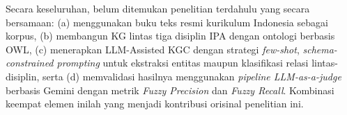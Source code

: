 \documentclass[../../thesis]{subfiles}
\begin{document}
Secara keseluruhan, belum ditemukan penelitian terdahulu yang secara
bersamaan: (a) menggunakan buku teks resmi kurikulum Indonesia sebagai
korpus, (b) membangun KG lintas tiga disiplin IPA dengan ontologi
berbasis OWL, (c) menerapkan LLM-Assisted KGC dengan strategi
\textit{few-shot}, \textit{schema-constrained prompting} untuk ekstraksi
entitas maupun klasifikasi relasi lintas-disiplin, serta (d)
memvalidasi hasilnya menggunakan \textit{pipeline LLM-as-a-judge} berbasis Gemini
dengan metrik \textit{Fuzzy Precision} dan \textit{Fuzzy Recall}. Kombinasi keempat elemen
inilah yang menjadi kontribusi orisinal penelitian ini.

\ifSubfilesClassLoaded{\printbibliography[title={Daftar Pustaka}]}{}
\end{document}
